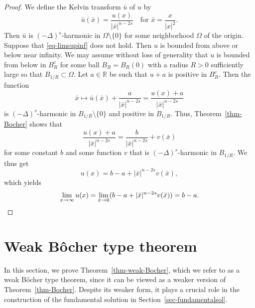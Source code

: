 \documentclass[11pt]{amsart}
\theoremstyle{plain}
\theoremstyle{definition}
\numberwithin{equation}{section}
\begin{document}
\begin{proof}
We define the Kelvin transform $\bar{u}$ of $u$ by
\begin{equation*}
    \bar{u}(\bar{x}) = \frac{u(x)}{|\bar{x}|^{n-2s}} \quad \text{for } \bar{x}=\frac{x}{|x|^2}.
\end{equation*}
Then $\bar{u}$ is $(-\Delta)^s$-harmonic in $\Omega \setminus \{0\}$ for some neighborhood $\Omega$ of the origin. Suppose that \eqref{eq-limsupinf} does not hold. Then $u$ is bounded from above or below near infinity. We may assume without loss of generality that $u$ is bounded from below in $B_R^c$ for some ball $B_R=B_R(0)$ with a radius $R>0$ sufficiently large so that $B_{1/R} \subset \Omega$. Let $a \in \mathbb{R}$ be such that $u+a$ is positive in $B_R^c$. Then the function
\begin{equation*}
    \bar{x} \mapsto \bar{u}(\bar{x}) + \frac{a}{|\bar{x}|^{n-2s}} = \frac{u(x)+a}{|\bar{x}|^{n-2s}}
\end{equation*}
is $(-\Delta)^s$-harmonic in $B_{1/R} \setminus \{0\}$ and positive in $B_{1/R}$. Thus, Theorem~\ref{thm-Bocher} shows that
\begin{equation*}
    \frac{u(x)+a}{|\bar{x}|^{n-2s}} = \frac{b}{|\bar{x}|^{n-2s}} + v(\bar{x})
\end{equation*}
for some constant $b$ and some function $v$ that is $(-\Delta)^s$-harmonic in $B_{1/R}$. We thus get
\begin{equation*}
    u(x) = b-a + |\bar{x}|^{n-2s} v(\bar{x}),
\end{equation*}
which yields
\begin{equation*}
    \lim_{x \to \infty} u(x) = \lim_{\bar{x} \to 0} (b-a + |\bar{x}|^{n-2s} v(\bar{x})) = b-a. \qedhere
\end{equation*}
\end{proof}







\section{Weak B\^ocher type theorem}\label{sec-weak-Bocher}

In this section, we prove Theorem~\ref{thm-weak-Bocher}, which we refer to as a weak B\^ocher type theorem, since it can be viewed as a weaker version of Theorem~\ref{thm-Bocher}. Despite its weaker form, it plays a crucial role in the construction of the fundamental solution in Section~\ref{sec-fundamentalsol}.
\end{document}
